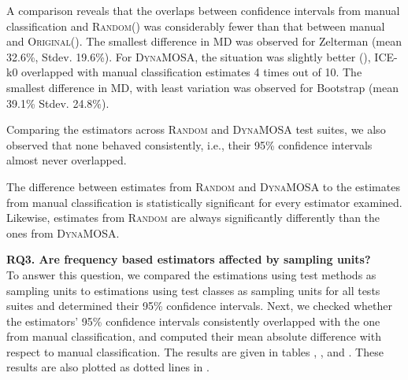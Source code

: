 \documentclass[sigconf,review,anonymous]{acmart}
\newcommand{\ICEallrare}{ICE-k0\xspace}
\newcommand{\Zelterman}{Zelterman\xspace}
\newcommand{\Evosuite}{\textsc{EvoSuite}\xspace}
\newcommand{\original}{\textsc{Original}\xspace}
\newcommand{\EvosuiteRandom}{\textsc{Random}\xspace}
\newcommand{\EvosuiteDynamosa}{\textsc{DynaMOSA}\xspace}
\begin{document}
A comparison reveals that the overlaps between confidence intervals
from manual classification and \EvosuiteRandom () was
considerably fewer than that between manual and \original ().
The smallest difference in MD was observed for \Zelterman
(mean 32.6\%, Stdev. 19.6\%).
%
For \EvosuiteDynamosa, the situation was slightly better (), \ICEallrare
overlapped with manual classification estimates 4 times out of 10.
The smallest difference in MD, with least variation was observed for
Bootstrap (mean 39.1\% Stdev. 24.8\%).

Comparing the estimators across \EvosuiteRandom and \EvosuiteDynamosa
test suites, we also observed that none behaved consistently, i.e.,
their 95\% confidence intervals almost never overlapped.

\begin{tcolorbox}[boxrule=0.5pt, arc=4pt, boxsep=0pt, width=\columnwidth]
The difference between estimates from \EvosuiteRandom and \EvosuiteDynamosa
to the estimates from manual classification is statistically significant for every estimator examined.
Likewise, estimates from \EvosuiteRandom are always significantly differently
than the ones from \EvosuiteDynamosa.
\end{tcolorbox}



\noindent\textbf{RQ3. 
Are frequency based estimators affected by sampling units?
}\\ %
To answer this question, we compared the estimations 
using test methods as sampling units to estimations using test classes as
sampling units for all tests suites and
determined their 95\% confidence intervals.
%
Next, we checked whether the estimators' 95\% confidence intervals consistently
overlapped with the one from manual classification, and computed their mean absolute
difference with respect to manual classification.
%
The results are given in tables ,
, and .
These results are also plotted as dotted lines in .
\end{document}
